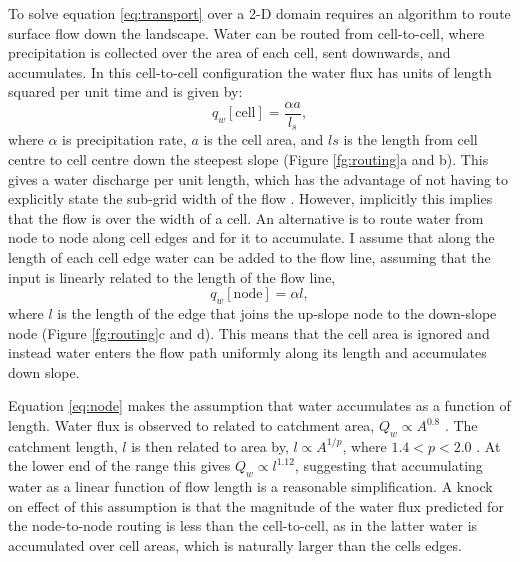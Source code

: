 \begin{subappendices}
To solve equation \ref{eq:transport} over a 2-D domain requires an algorithm to route surface flow down the landscape. Water can be routed from cell-to-cell, where precipitation is collected over the area of each cell, sent downwards, and accumulates. In this cell-to-cell configuration the water flux has units of length squared per unit time and is given by:
\begin{equation}
q_{w}\mathrm{[cell]} = \frac{\alpha a}{l_{s}},
\label{eq:cell}
\end{equation}
where $\alpha$ is precipitation rate, $a$ is the cell area, and $l{s}$ is the length from cell centre to cell centre down the steepest slope (Figure \ref{fg:routing}a and b). This gives a water discharge per unit length, which has the advantage of not having to explicitly state the sub-grid width of the flow \citep{simpson-2003}. However, implicitly this implies that the flow is over the width of a cell. An alternative is to route water from node to node along cell edges and for it to accumulate. I assume that along the length of each cell edge water can be added to the flow line, assuming that the input is linearly related to the length of the flow line,
\begin{equation}
q_{w}\mathrm{[node]} = \alpha l,
\label{eq:node}
\end{equation}
where $l$ is the length of the edge that joins the up-slope node to the down-slope node (Figure \ref{fg:routing}c and d). This means that the cell area is ignored and instead water enters the flow path uniformly along its length and accumulates down slope.

Equation \ref{eq:node} makes the assumption that water accumulates as a function of length. Water flux is observed to related to catchment area, $Q_{w} \propto A^{0.8}$ \citep{syvitski-2007}. The catchment length, $l$ is then related to area by, $l\propto A^{1/p}$, where $1.4<p<2.0$ \citep{armitage-etal-esurf-2018}. At the lower end of the range this gives $Q_{w} \propto l^{1.12}$, suggesting that accumulating water as a linear function of flow length is a reasonable simplification. A knock on effect of this assumption is that the magnitude of the water flux predicted for the node-to-node routing is less than the cell-to-cell, as in the latter water is accumulated over cell areas, which is naturally larger than the cells edges.


\end{subappendices}
